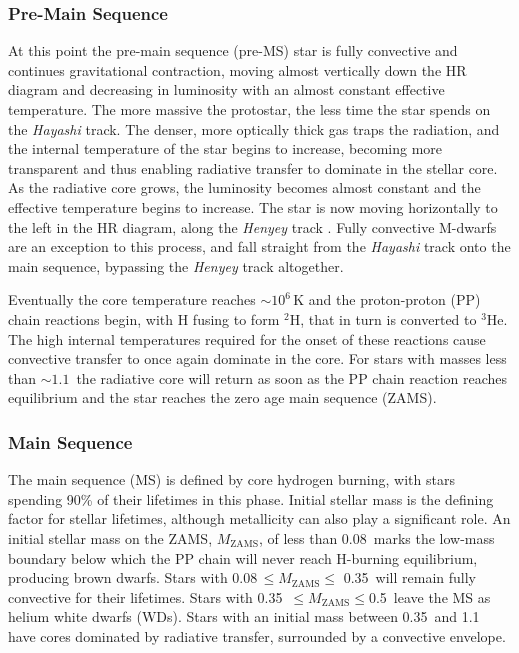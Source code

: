 \subsubsection{Pre-Main Sequence}

At this point the pre-main sequence (pre-MS) star is fully convective and continues gravitational contraction, moving almost vertically down the HR diagram and decreasing in luminosity with an almost constant effective temperature. The more massive the protostar, the less time the star spends on the {\em Hayashi} track. The denser, more optically thick gas traps the radiation, and the internal temperature of the star begins to increase, becoming more transparent and thus enabling radiative transfer to dominate in the stellar core. As the radiative core grows, the luminosity becomes almost constant and the effective temperature begins to increase. The star is now moving horizontally to the left in the HR diagram, along the {\em Henyey} track \citep{henyey_early_1955}. Fully convective M-dwarfs are an exception to this process, and fall straight from the {\em Hayashi} track onto the main sequence, bypassing the {\em Henyey} track altogether.

Eventually the core temperature reaches $\sim10^6$\,K and the proton-proton (PP) chain reactions begin, with H fusing to form ${}^{2}$H, that in turn is converted to ${}^{3}$He. The high internal temperatures required for the onset of these reactions cause convective transfer to once again dominate in the core. For stars with masses less than $\sim1.1\,$\Msol{} the radiative core will return as soon as the PP chain reaction reaches equilibrium and the star reaches the zero age main sequence (ZAMS).

\subsubsection{Main Sequence}

The main sequence (MS) is defined by core hydrogen burning, with stars spending \texttildelow{}90\% of their lifetimes in this phase. Initial stellar mass is the defining factor for stellar lifetimes, although metallicity can also play a significant role. An initial stellar mass on the ZAMS, $M_{\mathrm{ZAMS}}$, of less than 0.08\,\Msol{} marks the low-mass boundary below which the PP chain will never reach H-burning equilibrium, producing brown dwarfs. Stars with 0.08\,\Msol$ \leq M_{\mathrm{ZAMS}} \leq $ 0.35\,\Msol{} will remain fully convective for their lifetimes. Stars with 0.35\,\Msol{} $\leq M_{\mathrm{ZAMS}} \leq $0.5\,\Msol{} leave the MS as helium white dwarfs (WDs). Stars with an initial mass between 0.35\,\Msol{} and 1.1\,\Msol{} have cores dominated by radiative transfer, surrounded by a convective envelope.

